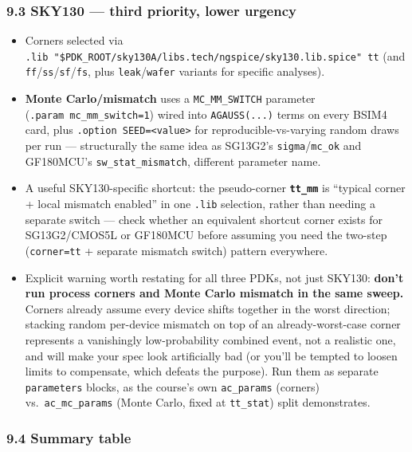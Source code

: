 \documentclass[
]{article}
\providecommand{\tightlist}{%
  \setlength{\itemsep}{0pt}\setlength{\parskip}{0pt}}
\begin{document}
\hypertarget{sky130-third-priority-lower-urgency}{%
\subsubsection{9.3 SKY130 --- third priority, lower
urgency}\label{sky130-third-priority-lower-urgency}}

\begin{itemize}
\tightlist
\item
  Corners selected via
  \texttt{.lib\ "\$PDK\_ROOT/sky130A/libs.tech/ngspice/sky130.lib.spice"\ tt}
  (and \texttt{ff}/\texttt{ss}/\texttt{sf}/\texttt{fs}, plus
  \texttt{leak}/\texttt{wafer} variants for specific analyses).
\item
  \textbf{Monte Carlo/mismatch} uses a \texttt{MC\_MM\_SWITCH} parameter
  (\texttt{.param\ mc\_mm\_switch=1}) wired into \texttt{AGAUSS(...)}
  terms on every BSIM4 card, plus
  \texttt{.option\ SEED=\textless{}value\textgreater{}} for
  reproducible-vs-varying random draws per run --- structurally the same
  idea as SG13G2's \texttt{sigma}/\texttt{mc\_ok} and GF180MCU's
  \texttt{sw\_stat\_mismatch}, different parameter name.
\item
  A useful SKY130-specific shortcut: the pseudo-corner
  \textbf{\texttt{tt\_mm}} is ``typical corner + local mismatch
  enabled'' in one \texttt{.lib} selection, rather than needing a
  separate switch --- check whether an equivalent shortcut corner exists
  for SG13G2/CMOS5L or GF180MCU before assuming you need the two-step
  (\texttt{corner=tt} + separate mismatch switch) pattern everywhere.
\item
  Explicit warning worth restating for all three PDKs, not just SKY130:
  \textbf{don't run process corners and Monte Carlo mismatch in the same
  sweep.} Corners already assume every device shifts together in the
  worst direction; stacking random per-device mismatch on top of an
  already-worst-case corner represents a vanishingly low-probability
  combined event, not a realistic one, and will make your spec look
  artificially bad (or you'll be tempted to loosen limits to compensate,
  which defeats the purpose). Run them as separate \texttt{parameters}
  blocks, as the course's own \texttt{ac\_params} (corners)
  vs.~\texttt{ac\_mc\_params} (Monte Carlo, fixed at \texttt{tt\_stat})
  split demonstrates.
\end{itemize}

\hypertarget{summary-table}{%
\subsubsection{9.4 Summary table}\label{summary-table}}
\end{document}
